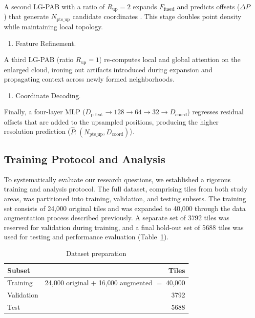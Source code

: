 \documentclass[remotesensing,article,accept,pdftex,moreauthors]{Definitions/mdpi}
\begin{document}
A second LG-PAB with a ratio of $R_{\text{up}}=2$ expands $F_{\text{fused}}$ and predicts offsets ($\Delta P$) that generate $N_{\text{pts\_up}}$ candidate coordinates
. This stage doubles point density while maintaining local topology.

\begin{enumerate}
\item[(5)] {Feature Refinement.}
\end{enumerate}

A third LG-PAB (ratio $R_{\text{up}}=1$) re-computes local and global attention on the enlarged cloud, ironing out artifacts introduced during expansion and propagating context across newly formed neighborhoods.

\begin{enumerate}
\item[(6)] {Coordinate Decoding.}
\end{enumerate}

Finally, a four-layer MLP ($D_{\text{p\_feat}} \rightarrow 128 \rightarrow 64 \rightarrow 32 \rightarrow D_{\text{coord}}$) regresses residual offsets that are added to the upsampled positions, producing the higher resolution prediction ($\hat{P}: (N_{\text{pts\_up}}, D_{\text{coord}})$).

\subsection{Training Protocol and Analysis}
\label{sec:study_design}
To systematically evaluate our research questions, we established a rigorous training and analysis protocol. The full dataset, comprising tiles from both study areas, was partitioned into training, validation, and testing subsets. The training set consists of 24,000 original tiles and was expanded to 40,000 through the data augmentation process described previously. A separate set of 3792 tiles was reserved for validation during training, and a final hold-out set of 5688 tiles was used for testing and performance evaluation \mbox{(Table \ref{tab:data_prep})}.
\begin{table}[htbp]
  \centering
  \caption{Dataset preparation}
  \label{tab:data_prep}
  \begin{tabular}{lr}
    \toprule
    \textbf{Subset} & \textbf{Tiles} \\
    \midrule
    Training        & 24,000 original $+$ 16,000 augmented $=$ 40,000 \\
    Validation      & 3792 \\
    Test            & 5688 \\
    \bottomrule
  \end{tabular}
\end{table}
\end{document}
